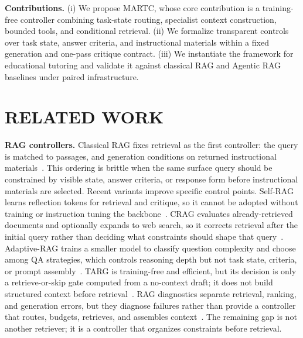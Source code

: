 \documentclass[letterpaper, 10 pt, conference]{ieeeconf}
\begin{document}

\noindent\textbf{Contributions.} (i) We propose \textsc{MARTC}, whose core contribution is a training-free controller combining task-state routing, specialist context construction, bounded tools, and conditional retrieval. (ii) We formalize transparent controls over task state, answer criteria, and instructional materials within a fixed generation and one-pass critique contract. (iii) We instantiate the framework for educational tutoring and validate it against classical RAG and Agentic RAG baselines under paired infrastructure.

\section{RELATED WORK}

\noindent\textbf{RAG controllers.} Classical RAG fixes retrieval as the first controller: the query is matched to passages, and generation conditions on returned instructional materials~\cite{lewis2020rag}. This ordering is brittle when the same surface query should be constrained by visible state, answer criteria, or response form before instructional materials are selected. Recent variants improve specific control points. Self-RAG learns reflection tokens for retrieval and critique, so it cannot be adopted without training or instruction tuning the backbone~\cite{asai2024selfrag}. CRAG evaluates already-retrieved documents and optionally expands to web search, so it corrects retrieval after the initial query rather than deciding what constraints should shape that query~\cite{yan2024crag}. Adaptive-RAG trains a smaller model to classify question complexity and choose among QA strategies, which controls reasoning depth but not task state, criteria, or prompt assembly~\cite{jeong2024adaptiverag}. TARG is training-free and efficient, but its decision is only a retrieve-or-skip gate computed from a no-context draft; it does not build structured context before retrieval~\cite{wang2026targ}. RAG diagnostics separate retrieval, ranking, and generation errors, but they diagnose failures rather than provide a controller that routes, budgets, retrieves, and assembles context~\cite{ru2024ragchecker}. The remaining gap is not another retriever; it is a controller that organizes constraints before retrieval.
\end{document}
